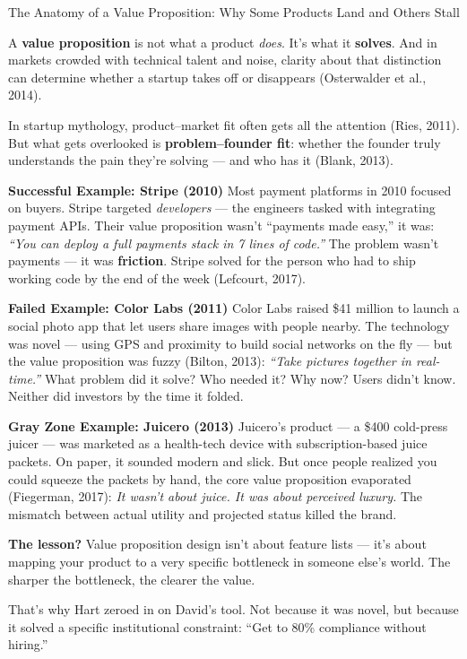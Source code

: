 \begin{HistoricalSidebar}{The Anatomy of a Value Proposition: Why Some Products Land and Others Stall}

    A \textbf{value proposition} is not what a product \textit{does}. It's what it \textbf{solves}. And in 
    markets crowded with technical talent and noise, clarity about that distinction can determine 
    whether a startup takes off or disappears (Osterwalder et al., 2014).
  
    \medskip
  
    In startup mythology, product–market fit often gets all the attention (Ries, 2011). But what gets 
    overlooked is \textbf{problem–founder fit}: whether the founder truly understands the pain they’re 
    solving — and who has it (Blank, 2013).
  
    \medskip
  
    \textbf{Successful Example: Stripe (2010)}  
    Most payment platforms in 2010 focused on buyers. Stripe targeted \textit{developers} — the engineers 
    tasked with integrating payment APIs. Their value proposition wasn’t “payments made easy,” it was:  
    \textit{“You can deploy a full payments stack in 7 lines of code.”}  
    The problem wasn’t payments — it was \textbf{friction}. Stripe solved for the person who had to ship 
    working code by the end of the week (Lefcourt, 2017).
  
    \medskip
  
    \textbf{Failed Example: Color Labs (2011)}  
    Color Labs raised \$41 million to launch a social photo app that let users share images with people 
    nearby. The technology was novel — using GPS and proximity to build social networks on the fly — but 
    the value proposition was fuzzy (Bilton, 2013):  
    \textit{“Take pictures together in real-time.”}  
    What problem did it solve? Who needed it? Why now? Users didn’t know. Neither did investors by the 
    time it folded.
  
    \medskip
  
    \textbf{Gray Zone Example: Juicero (2013)}  
    Juicero’s product — a \$400 cold-press juicer — was marketed as a health-tech device with 
    subscription-based juice packets. On paper, it sounded modern and slick. But once people realized 
    you could squeeze the packets by hand, the core value proposition evaporated (Fiegerman, 2017):  
    \textit{It wasn't about juice. It was about perceived luxury.}  
    The mismatch between actual utility and projected status killed the brand.
  
    \medskip
  
    \textbf{The lesson?}  
    Value proposition design isn’t about feature lists — it’s about mapping your product to a very 
    specific bottleneck in someone else’s world. The sharper the bottleneck, the clearer the value.
  
    \medskip
  
    That’s why Hart zeroed in on David’s tool. Not because it was novel, but because it solved a 
    specific institutional constraint:  
    “Get to 80\% compliance without hiring.”
  
\end{HistoricalSidebar}
  